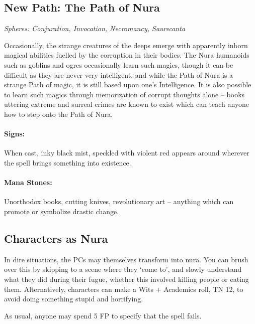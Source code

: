 \begin{multicols}{2}

\subsection{New Path: The Path of Nura}

\textit{Spheres: Conjuration, Invocation, Necromancy, Saurecanta}

\noindent Occasionally, the strange creatures of the deeps emerge with apparently inborn magical abilities fuelled by the corruption in their bodies.
The Nura humanoids such as goblins and ogres occasionally learn such magics, though it can be difficult as they are never very intelligent, and while the Path of Nura is a strange Path of magic, it is still based upon one's Intelligence.
It is also possible to learn such magics through memorization of corrupt thoughts alone -- books uttering extreme and surreal crimes are known to exist which can teach anyone how to step onto the Path of Nura.

\paragraph{Signs:} When cast, inky black mist, speckled with violent red appears around wherever the spell brings something into existence.

\paragraph{Mana Stones:} Unorthodox books, cutting knives, revolutionary art -- anything which can promote or symbolize drastic change.

\subsection{Characters as Nura}

In dire situations, the PCs may themselves transform into nura.
You can brush over this by skipping to a scene where they `come to', and slowly understand what they did during their fugue, whether this involved killing people or eating them.
Alternatively, characters can make a Wits + Academics roll, TN 12, to avoid doing something stupid and horrifying.

As usual, anyone may spend 5 FP to specify that the spell fails.

\end{multicols}


